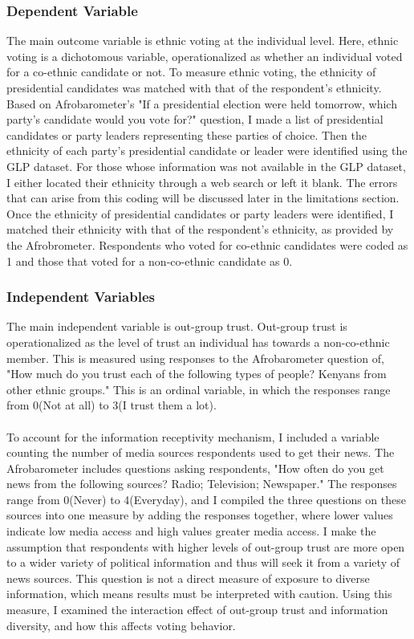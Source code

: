 \documentclass[a4paper, 12pt]{article}
\begin{document}
\subsubsection{Dependent Variable}
The main outcome variable is ethnic voting at the individual level. Here, ethnic voting is a dichotomous variable, operationalized as whether an individual voted for a co-ethnic candidate or not. To measure ethnic voting, the ethnicity of presidential candidates was matched with that of the respondent's ethnicity. Based on Afrobarometer's "If a presidential election were held tomorrow, which party's candidate would you vote for?" question, I made a list of presidential candidates or party leaders representing these parties of choice. Then the ethnicity of each party's presidential candidate or leader were identified using the GLP dataset. For those whose information was not available in the GLP dataset, I either located their ethnicity through a web search or left it blank. The errors that can arise from this coding will be discussed later in the limitations section. Once the ethnicity of presidential candidates or party leaders were identified, I matched their ethnicity with that of the respondent's ethnicity, as provided by the Afrobrometer. Respondents who voted for co-ethnic candidates were coded as 1 and those that voted for a non-co-ethnic candidate as 0. 

\subsubsection{Independent Variables}
The main independent variable is out-group trust. Out-group trust is operationalized as the level of trust an individual has towards a non-co-ethnic member. This is measured using responses to the Afrobarometer question of, "How much do you trust each of the following types of people? Kenyans from other ethnic groups." This is an ordinal variable, in which the responses range from 0(Not at all) to 3(I trust them a lot).
\paragraph{}
To account for the information receptivity mechanism, I included a variable counting the number of media sources respondents used to get their news. The Afrobarometer includes questions asking respondents, "How often do you get news from the following sources? Radio; Television; Newspaper." The responses range from 0(Never) to 4(Everyday), and I compiled the three questions on these sources into one measure by adding the responses together, where lower values indicate low media access and high values greater media access. I make the assumption that respondents with higher levels of out-group trust are more open to a wider variety of political information and thus will seek it from a variety of news sources. This question is not a direct measure of exposure to diverse information, which means results must be interpreted with caution. Using this measure, I examined the interaction effect of out-group trust and information diversity, and how this affects voting behavior.
\end{document}
